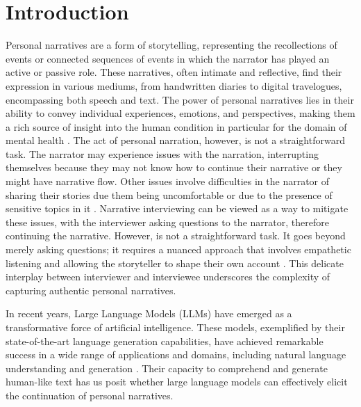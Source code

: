 \chapter{Introduction}
\label{cha:intro}
Personal narratives are a form of storytelling, representing the recollections of events or connected sequences of events in which the narrator has played an active or passive role. These narratives, often intimate and reflective, find their expression in various mediums, from handwritten diaries to digital travelogues, encompassing both speech and text. The power of personal narratives lies in their ability to convey individual experiences, emotions, and perspectives, making them a rich source of insight into the human condition \cite{noauthor-undated-sy, doi:10.1080/1361332032000044567, Bailey2002-fw} in particular for the domain of mental health \cite{Nurser2018-id}. %
The act of personal narration, however, is not a straightforward task. The narrator may experience issues with the narration, interrupting themselves because they may not know how to continue their narrative or they might have narrative flow. Other issues involve difficulties in the narrator of sharing their stories due them being uncomfortable or due to the presence of sensitive topics in it \cite{Sammantha2021-na}. Narrative interviewing can be viewed as a way to mitigate these issues, with the interviewer asking questions to the narrator, therefore continuing the narrative. However, is not a straightforward task. It goes beyond merely asking questions; it requires a nuanced approach that involves empathetic listening and allowing the storyteller to shape their own account \cite{Kim2015-es}. This delicate interplay between interviewer and interviewee underscores the complexity of capturing authentic personal narratives.

In recent years, Large Language Models (LLMs) have emerged as a transformative force of artificial intelligence. These models, exemplified by their state-of-the-art language generation capabilities, have achieved remarkable success in a wide range of applications and domains, including natural language understanding and generation \cite{openai2023gpt4, touvronllama, brown2020language}. Their capacity to comprehend and generate human-like text \cite{schramowski2022large} has us posit whether large language models can effectively elicit the continuation of personal narratives.

